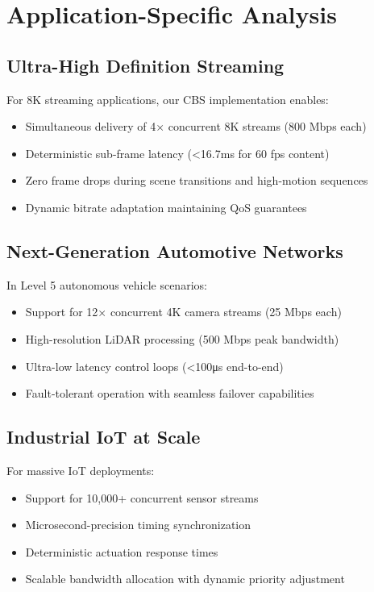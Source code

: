 \documentclass[10pt, journal, compsoc]{IEEEtran}
\begin{document}
\section{Application-Specific Analysis}

\subsection{Ultra-High Definition Streaming}

For 8K streaming applications, our CBS implementation enables:

\begin{itemize}
    \item Simultaneous delivery of 4× concurrent 8K streams (800 Mbps each)
    \item Deterministic sub-frame latency (<16.7ms for 60 fps content)
    \item Zero frame drops during scene transitions and high-motion sequences
    \item Dynamic bitrate adaptation maintaining QoS guarantees
\end{itemize}

\subsection{Next-Generation Automotive Networks}

In Level 5 autonomous vehicle scenarios:

\begin{itemize}
    \item Support for 12× concurrent 4K camera streams (25 Mbps each)
    \item High-resolution LiDAR processing (500 Mbps peak bandwidth)
    \item Ultra-low latency control loops (<100μs end-to-end)
    \item Fault-tolerant operation with seamless failover capabilities
\end{itemize}

\subsection{Industrial IoT at Scale}

For massive IoT deployments:

\begin{itemize}
    \item Support for 10,000+ concurrent sensor streams
    \item Microsecond-precision timing synchronization
    \item Deterministic actuation response times
    \item Scalable bandwidth allocation with dynamic priority adjustment
\end{itemize}
\end{document}
